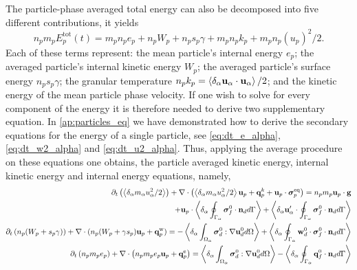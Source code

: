 The particle-phase averaged total energy can also be decomposed into five different contributions, it yields 
\begin{equation*}
    n_p m_p E_p^\text{tot}(t) 
    = m_p n_p e_p 
    + n_p W_p
    + n_p s_p \gamma
    + m_p n_p k_p
    + m_p n_p (u_p)^2/2. 
    \label{eq:E_p_def}
\end{equation*}
Each of these terms represent: 
the mean particle's internal energy $e_p$; 
the averaged particle's internal kinetic energy $W_p$;
the averaged particle's surface energy $n_p s_p \gamma$;
the granular temperature $n_p k_p =\left<\delta_\alpha \textbf{u}_\alpha \cdot\textbf{u}_\alpha\right>/2$;
and the kinetic energy of the mean particle phase velocity. 
If one wish to solve for every component of the energy it is therefore needed to derive two supplementary equation. 
In \ref{ap:particles_eq} we have demonstrated how to derive the secondary equations for the energy of a single particle, see  \ref{eq:dt_e_alpha}, \ref{eq:dt_w2_alpha} and \ref{eq:dt_u2_alpha}. 
Thus, applying the average procedure on these equations one obtains, the particle averaged kinetic energy, internal kinetic energy and internal energy equations, namely,
\begin{align}
    \label{eq:dt_hybrid_u2p}
    \partial_t \left(\left<\delta_\alpha m_\alpha u_\alpha^2/2\right>\right)
    + \mathbf{\nabla}\cdot \left(\left<\delta_\alpha m_\alpha u_\alpha^2/2\right> \textbf{u}_p 
    + \textbf{q}^k_p
    + \textbf{u}_p \cdot \bm{\sigma}_p^\text{eq}
    \right)
    = 
    n_p m_p \textbf{u}_p \cdot
    \textbf{g}\nonumber\\
    + \textbf{u}_p\cdot\left<\delta_\alpha \oint_{\Gamma_{\alpha}} {\bm{\sigma}_f^0 \cdot \textbf{n}_d} d\Gamma\right>
    + \left<\delta_\alpha \textbf{u}_\alpha'\cdot\oint_{\Gamma_{\alpha}} \bm{\sigma}_f^0 \cdot \textbf{n}_d d\Gamma\right>
    \\
    \label{eq:dt_hybrid_Wp}
    \partial_t \left(n_p (W_p + s_p\gamma)\right)
    + \mathbf{\nabla}\cdot 
    (n_p (W_p + \gamma s_p)
    \textbf{u}_p 
    +  \textbf{q}_p^\text{w}
    )
    = 
    - \left<\delta_\alpha \int_{\Omega_{\alpha}} {\bm{\sigma}_d^0 : \mathbf{\nabla}\textbf{u}_d^0} d\Omega\right>
    + \left<\delta_\alpha \oint_{\Gamma_{\alpha}} {\textbf{w}_d^0 \cdot \bm{\sigma}_f^0 \cdot  \textbf{n}_d} d\Gamma\right>
    \\
    \partial_t \left(n_p m_p e_p\right)
    + \mathbf{\nabla}\cdot \left(n_p
    m_p e_p \textbf{u}_p 
    +  \textbf{q}_p^\text{e}
    \right)
    = 
    \left<\delta_\alpha \int_{\Omega_{\alpha}} {\bm{\sigma}_d^0 : \mathbf{\nabla}\textbf{u}_d^0} d\Omega\right>
    - \left<\delta_\alpha \oint_{\Gamma_{\alpha}} {\textbf{q}_f^0\cdot \textbf{n}_d} d\Gamma\right>
    \label{eq:dt_hybrid_ep}
\end{align}
